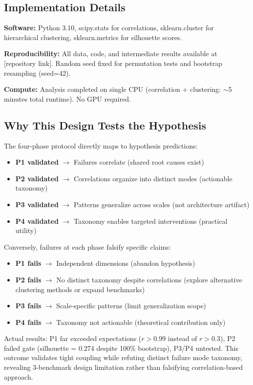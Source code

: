 \subsection{Implementation Details}

\textbf{Software:} Python 3.10, scipy.stats for correlations, sklearn.cluster for hierarchical clustering, sklearn.metrics for silhouette scores.

\textbf{Reproducibility:} All data, code, and intermediate results available at [repository link]. Random seed fixed for permutation tests and bootstrap resampling (seed=42).

\textbf{Compute:} Analysis completed on single CPU (correlation + clustering: $\sim$5 minutes total runtime). No GPU required.

\subsection{Why This Design Tests the Hypothesis}

The four-phase protocol directly maps to hypothesis predictions:
\begin{itemize}
\item \textbf{P1 validated} $\rightarrow$ Failures correlate (shared root causes exist)
\item \textbf{P2 validated} $\rightarrow$ Correlations organize into distinct modes (actionable taxonomy)
\item \textbf{P3 validated} $\rightarrow$ Patterns generalize across scales (not architecture artifact)
\item \textbf{P4 validated} $\rightarrow$ Taxonomy enables targeted interventions (practical utility)
\end{itemize}

Conversely, failures at each phase falsify specific claims:
\begin{itemize}
\item \textbf{P1 fails} $\rightarrow$ Independent dimensions (abandon hypothesis)
\item \textbf{P2 fails} $\rightarrow$ No distinct taxonomy despite correlations (explore alternative clustering methods or expand benchmarks)
\item \textbf{P3 fails} $\rightarrow$ Scale-specific patterns (limit generalization scope)
\item \textbf{P4 fails} $\rightarrow$ Taxonomy not actionable (theoretical contribution only)
\end{itemize}

Actual results: P1 far exceeded expectations ($r > 0.99$ instead of $r > 0.3$), P2 failed gate (silhouette = 0.274 despite 100\% bootstrap), P3/P4 untested. This outcome validates tight coupling while refuting distinct failure mode taxonomy, revealing 3-benchmark design limitation rather than falsifying correlation-based approach.
